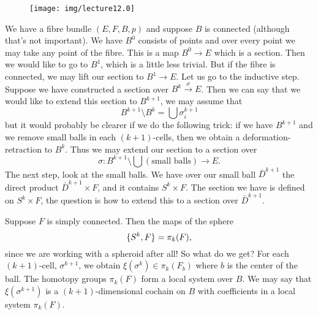 \begin{wrapfigure}{r}{1.5in}
  \vspace{-20pt}
  \begin{center}
    \texttt{[image: img/lecture12.0]}
  \end{center}
  \vspace{-20pt}
\end{wrapfigure}
We have a fibre bundle $(E,F,B,p)$ and suppose $B$ is connected
(although that's not important). We have $B^{0}$ consists of
points and over every point we may take any point of the
fibre. This is a map $B^{0}\to E$ which is a section. Then we
would like to go to $B^{1}$, which is a little less trivial. But
if the fibre is connected, we may lift our section to $B^{1}\to E$.
Let us go to the inductive step.
Suppose we have constructed a section over
$B^{k}\xrightarrow{\sigma}E$. Then we can say that we would like
to extend this section to $B^{k+1}$, we may assume that 
\begin{equation}
B^{k+1}\setminus B^{k}=\bigcup\sigma^{k+1}_{i}
\end{equation}
but it would probably be clearer if we do the following trick: if
we have $B^{k+1}$ and we remove small balls in each
$(k+1)$-cells, then we obtain a deformation-retraction to
$B^{k}$. Thus we may extend our section to a section over
\begin{equation}
\sigma\colon B^{k+1}\setminus\bigcup(\mbox{small balls})\to E.
\end{equation}
The next step, look at the small balls. We have over our small
ball $\bar{D}^{k+1}$ the direct product $\bar{D}^{k+1}\times F$,
and it contains $S^{k}\times F$. The section we have is defined
on $S^{k}\times F$, the question is how to extend this to a
section over $\bar{D}^{k+1}$.

Suppose $F$ is simply connected. Then the maps of the sphere
\begin{equation}
\homotopyClass(S^k,F)=\pi_{k}(F),
\end{equation}
since we are working with a spheroid after all! So what do we
get? For each $(k+1)$-cell, $\sigma^{k+1}$, we obtain
$\xi(\sigma^{k})\in\pi_{k}(F_{b})$ where $b$ is the center of the
ball. The homotopy groups $\pi_{k}(F)$ form a local system over
$B$. We may say that $\xi(\sigma^{k+1})$ is a $(k+1)$-dimensional
cochain on $B$ with coefficients in a local system $\pi_{k}(F)$.


